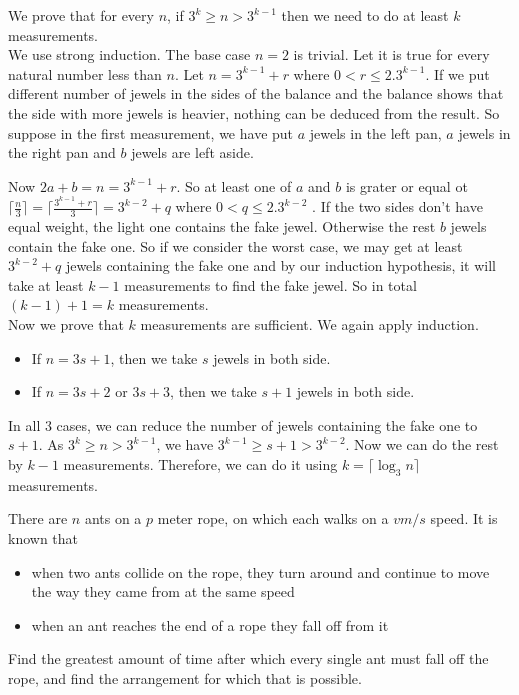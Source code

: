 \documentclass{subfile}
\begin{document}
		\begin{solution}
			We prove that for every $n$, if $ 3^k \geq n >3^{k-1}$ then we need to do at least $k$ measurements.\\
            We use strong induction. The base case $n=2$ is trivial. Let it is true for every natural number less than $n$. Let $n=3^{k-1}+r$ where $0<r \leq 2.3^{k-1}$. If we put different number of jewels in the sides of the balance and the balance shows that the side with more jewels is heavier, nothing can be deduced from the result. So suppose in the first measurement, we have put $a$ jewels in the left pan, $a$ jewels in the right pan and $b$ jewels are left aside.
            
            Now $2a+b=n=3^{k-1}+r$. So at least one of $a$ and $b$ is grater or equal ot $\lceil\frac{n}{3}\rceil=\lceil\frac{3^{k-1}+r}{3}\rceil=3^{k-2}+q$ where $0<q \leq 2.3^{k-2}$ .
            If the two sides don't have equal weight, the light one contains the fake jewel. Otherwise the rest $b$ jewels contain the fake one. So if we consider the worst case, we may get at least $3^{k-2}+q$ jewels containing the fake one and by our induction hypothesis, it will take at least $k-1$ measurements to find the fake jewel. So in total $(k-1)+1=k$ measurements. \\
            
            Now we prove that $k$ measurements are sufficient. We again apply induction.
	            \begin{itemize}
	            	\item If $n=3s+1$, then we take $s$ jewels in both side.
	            	\item If $n=3s+2$ or $3s+3$, then we take $s+1$ jewels in both side. 
	            \end{itemize}
            In all $3$ cases, we can reduce the number of jewels containing the fake one to $s+1$. As $ 3^k \geq n >3^{k-1}$, we have $3^{k-1} \geq s+1 > 3^{k-2}$. Now we can do the rest by $k-1$ measurements. Therefore, we can do it using $k=\lceil\log_{3}n\rceil$  measurements.
		\end{solution}
		
		\begin{problem}
			There are $n$ ants on a $p$ meter rope, on which each walks on a $v m/s$ speed. It is known that 
				\begin{itemize}
					\item when two ants collide on the rope, they turn around and continue to move the way they came from at the same speed
					\item when an ant reaches the end of a rope they fall off from it
				\end{itemize}
			Find the greatest amount of time after which every single ant must fall off the rope, and find
			the arrangement for which that is possible.
		\end{problem}
		
\end{document}
